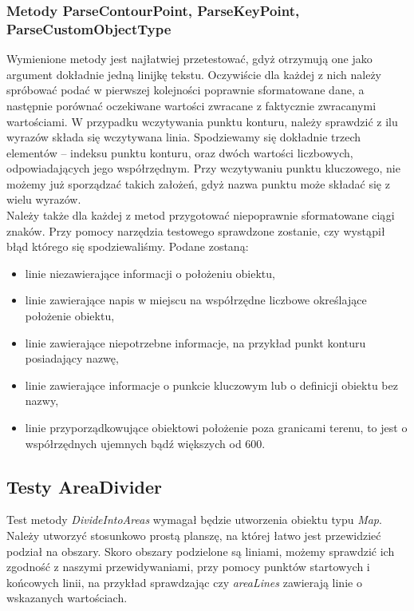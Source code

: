 \documentclass[a4paper,11pt]{article}
\newcommand\tab[1][0.6cm]{\hspace*{#1}}
\begin{document}
\subsubsection{Metody ParseContourPoint, ParseKeyPoint, ParseCustomObjectType}
\tab Wymienione metody jest najłatwiej przetestować, gdyż otrzymują one jako argument dokładnie jedną linijkę tekstu. Oczywiście dla każdej z nich należy spróbować podać w pierwszej kolejności poprawnie sformatowane dane, a następnie porównać oczekiwane wartości zwracane z faktycznie zwracanymi wartościami. W przypadku wczytywania punktu konturu, należy sprawdzić z ilu wyrazów składa się wczytywana linia. Spodziewamy się dokładnie trzech elementów -- indeksu punktu konturu, oraz dwóch wartości liczbowych, odpowiadających jego współrzędnym. Przy wczytywaniu punktu kluczowego, nie możemy już sporządzać takich założeń, gdyż nazwa punktu może składać się z wielu wyrazów. 
\\\tab Należy także dla każdej z metod przygotować niepoprawnie sformatowane ciągi znaków. Przy pomocy narzędzia testowego sprawdzone zostanie, czy wystąpił błąd którego się spodziewaliśmy. Podane zostaną:
\begin{itemize}
\item linie niezawierające informacji o położeniu obiektu,
\item linie zawierające napis w miejscu na współrzędne liczbowe określające położenie obiektu,
\item linie zawierające niepotrzebne informacje, na przykład punkt konturu posiadający nazwę,
\item linie zawierające informacje o punkcie kluczowym lub o definicji obiektu bez nazwy,
\item linie przyporządkowujące obiektowi położenie poza granicami terenu, to jest o współrzędnych ujemnych bądź większych od 600.

\end{itemize}

\subsection{Testy AreaDivider}

\tab Test metody \textit{DivideIntoAreas} wymagał będzie utworzenia obiektu typu \textit{Map}. Należy utworzyć stosunkowo prostą planszę, na której łatwo jest przewidzieć podział na obszary. Skoro obszary podzielone są liniami, możemy sprawdzić ich zgodność z naszymi przewidywaniami, przy pomocy punktów startowych i końcowych linii, na przykład sprawdzając czy \textit{areaLines} zawierają linie o wskazanych wartościach.
\end{document}
